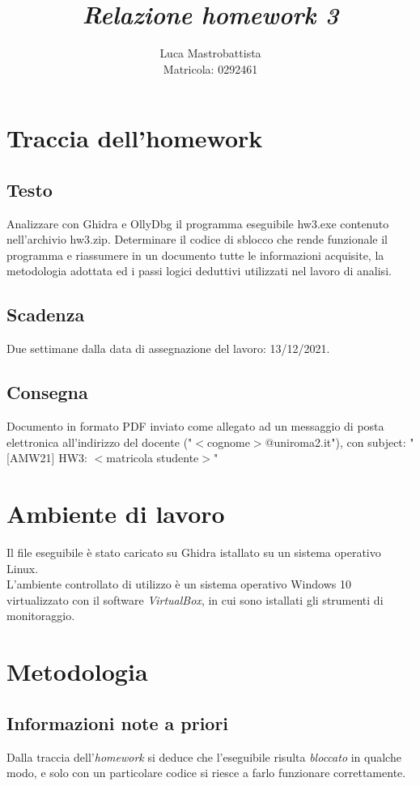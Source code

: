 \documentclass[a4paper, 12pt]{article}
\begin{document}
\sloppy
  
\title{
  \textbf{
    \emph{Relazione homework 3}
  }
}  
\author{Luca Mastrobattista\\ Matricola: 0292461}
\date{}
\maketitle

\tableofcontents
\newpage
\section{Traccia dell'homework}
\subsection{Testo}
Analizzare con Ghidra e OllyDbg il programma eseguibile
hw3.exe contenuto nell'archivio hw3.zip.
Determinare il codice di sblocco che rende funzionale il
programma e riassumere in un documento tutte le informazioni
acquisite, la metodologia adottata ed i passi logici deduttivi
utilizzati nel lavoro di analisi.
\subsection{Scadenza}
Due settimane dalla data di assegnazione del lavoro: 13/12/2021.
\subsection{Consegna}
Documento in formato PDF inviato come allegato ad
un messaggio di posta elettronica all'indirizzo del docente
("$<$cognome$>$@uniroma2.it"), con subject:
"[AMW21] HW3: $<$matricola studente$>$"

\newpage
\section{Ambiente di lavoro}
Il file eseguibile è stato caricato su Ghidra istallato su un sistema operativo Linux. \\
L'ambiente controllato di utilizzo è un sistema operativo Windows 10 virtualizzato con il software \emph{VirtualBox}, in cui sono istallati gli strumenti di monitoraggio.


\newpage
\section{Metodologia}

\subsection{Informazioni note a priori}
Dalla traccia dell'\emph{homework} si deduce che l'eseguibile risulta \textit{bloccato} in qualche modo, e solo con un particolare codice si riesce a farlo funzionare correttamente.
\end{document}
